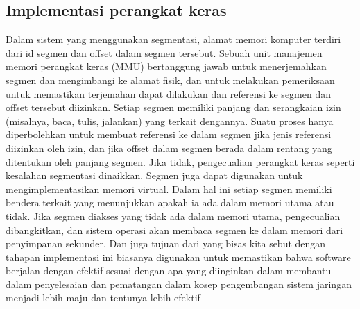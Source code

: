 \subsection{Implementasi perangkat keras}
Dalam sistem yang menggunakan segmentasi, alamat memori komputer terdiri dari id segmen dan offset dalam segmen tersebut. Sebuah unit manajemen memori perangkat keras (MMU) bertanggung jawab untuk menerjemahkan segmen dan mengimbangi ke alamat fisik, dan untuk melakukan pemeriksaan untuk memastikan terjemahan dapat dilakukan dan referensi ke segmen dan offset tersebut diizinkan.
Setiap segmen memiliki panjang dan serangkaian izin (misalnya, baca, tulis, jalankan) yang terkait dengannya. Suatu proses hanya diperbolehkan untuk membuat referensi ke dalam segmen jika jenis referensi diizinkan oleh izin, dan jika offset dalam segmen berada dalam rentang yang ditentukan oleh panjang segmen. Jika tidak, pengecualian perangkat keras seperti kesalahan segmentasi dinaikkan.
Segmen juga dapat digunakan untuk mengimplementasikan memori virtual. Dalam hal ini setiap segmen memiliki bendera terkait yang menunjukkan apakah ia ada dalam memori utama atau tidak. Jika segmen diakses yang tidak ada dalam memori utama, pengecualian dibangkitkan, dan sistem operasi akan membaca segmen ke dalam memori dari penyimpanan sekunder.
Dan juga tujuan dari yang bisas kita sebut dengan tahapan implementasi ini biasanya digunakan untuk memastikan bahwa software berjalan dengan efektif sesuai dengan apa yang diinginkan dalam membantu dalam penyelesaian dan pematangan dalam kosep pengembangan sistem jaringan menjadi lebih maju dan tentunya lebih efektif